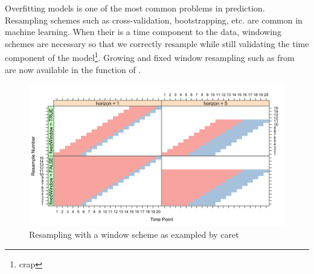 \documentclass[article]{jss}\usepackage[]{graphicx}\usepackage[]{color}
\begin{document}
Overfitting models is one of the most common problems in prediction. Resampling schemes such as cross-validation, bootstrapping, etc. are common in machine learning. When their is a time component to the data, windowing schemes are necessary so that we correctly resample while still validating the time component of the model\footnote{crap}. Growing and fixed window resampling such as from ~\cite{hyndman2014forecasting} are now available in the  function of .



\begin{figure}[h]
\caption{Resampling with a window scheme as exampled by caret}
  \includegraphics{windowing_pic_caret}
  \centering
\end{figure}
\clearpage


\end{document}
